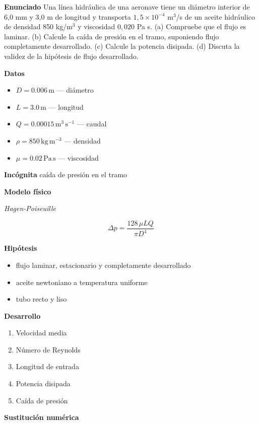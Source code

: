 \documentclass[10pt,openany]{book}
\begin{document}
\begin{tcolorbox}[title={Problema resuelto}, studiumworked, breakable]

\noindent\textbf{Enunciado}
Una línea hidráulica de una aeronave tiene un diámetro interior de 6,0 mm y 3,0 m de longitud y transporta \(1{,}5\times 10^{-4}\) m\(^3\)/s de un aceite hidráulico de densidad 850 kg/m\(^3\) y viscosidad \(0{,}020\) Pa s. (a) Compruebe que el flujo es laminar. (b) Calcule la caída de presión en el tramo, suponiendo flujo completamente desarrollado. (c) Calcule la potencia disipada. (d) Discuta la validez de la hipótesis de flujo desarrollado.

\noindent\textbf{Datos}
\begin{itemize}
\item $D = 0.006\,\mathrm{m}$ — diámetro
\item $L = 3.0\,\mathrm{m}$ — longitud
\item $Q = 0.00015\,\mathrm{m}^{3}\,\mathrm{s}^{-1}$ — caudal
\item $\rho = 850\,\mathrm{kg}\,\mathrm{m}^{-3}$ — densidad
\item $\mu = 0.02\,\mathrm{Pa}\,\mathrm{s}$ — viscosidad
\end{itemize}

\noindent\textbf{Incógnita}
caída de presión en el tramo

\noindent\textbf{Modelo físico}

\noindent\textit{Hagen-Poiseuille}

\[
\Delta p = \frac{128\,\mu L Q}{\pi D^{4}}
\]

\noindent\textbf{Hipótesis}
\begin{itemize}
\item flujo laminar, estacionario y completamente desarrollado
\item aceite newtoniano a temperatura uniforme
\item tubo recto y liso
\end{itemize}

\noindent\textbf{Desarrollo}
\begin{enumerate}
\item
Velocidad media
\item
Número de Reynolds
\item
Longitud de entrada
\item
Potencia disipada
\item
Caída de presión
\end{enumerate}

\noindent\textbf{Sustitución numérica}


\end{tcolorbox}
\end{document}
